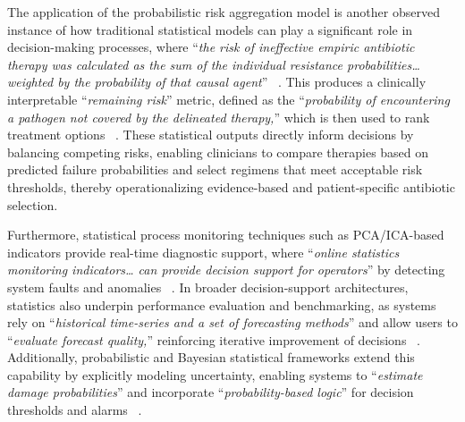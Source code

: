 \documentclass{sfuthesis}
\begin{document}
The application of the probabilistic risk aggregation model is another observed instance of how traditional statistical models can play a significant role in decision-making processes, where “\textit{the risk of ineffective empiric antibiotic therapy was calculated as the sum of the individual resistance probabilities…weighted by the probability of that causal agent}” ~\cite{muller2021risk}. This produces a clinically interpretable “\textit{remaining risk}” metric, defined as the “\textit{probability of encountering a pathogen not covered by the delineated therapy,}” which is then used to rank treatment options ~\cite{muller2021risk}. These statistical outputs directly inform decisions by balancing competing risks, enabling clinicians to compare therapies based on predicted failure probabilities and select regimens that meet acceptable risk thresholds, thereby operationalizing evidence-based and patient-specific antibiotic selection.\par
Furthermore, statistical process monitoring techniques such as PCA/ICA-based indicators provide real-time diagnostic support, where “\textit{online statistics monitoring indicators… can provide decision support for operators}” by detecting system faults and anomalies ~\cite{kim2025development}. In broader decision-support architectures, statistics also underpin performance evaluation and benchmarking, as systems rely on “\textit{historical time-series and a set of forecasting methods}” and allow users to “\textit{evaluate forecast quality,}” reinforcing iterative improvement of decisions ~\cite{Kozielski2021LPGDSS}. Additionally, probabilistic and Bayesian statistical frameworks extend this capability by explicitly modeling uncertainty, enabling systems to “\textit{estimate damage probabilities}” and incorporate “\textit{probability-based logic}” for decision thresholds and alarms ~\cite{Monti2025RailwayBridgeDSS}.
\end{document}
